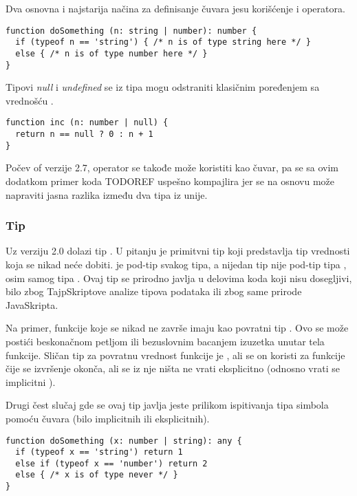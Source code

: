 Dva osnovna i najstarija načina za definisanje čuvara jesu korišćenje  i  operatora.

\begin{verbatim}
function doSomething (n: string | number): number {
  if (typeof n == 'string') { /* n is of type string here */ }
  else { /* n is of type number here */ }
}
\end{verbatim}

Tipovi \textit{null} i \textit{undefined} se iz tipa mogu odstraniti klasičnim poređenjem sa vrednošću .

\begin{verbatim}
function inc (n: number | null) {
  return n == null ? 0 : n + 1
}
\end{verbatim}

Počev of verzije 2.7, operator  se takođe može koristiti kao čuvar, pa se sa ovim dodatkom primer koda TODOREF uspešno kompajlira jer se na osnovu  može napraviti jasna razlika između dva tipa iz unije. 

\subsubsection{Tip }

Uz verziju 2.0 dolazi tip .
U pitanju je primitvni tip koji predstavlja tip vrednosti koja se nikad neće dobiti.
 je pod-tip svakog tipa, a nijedan tip nije pod-tip tipa , osim samog tipa .
Ovaj tip se prirodno javlja u delovima koda koji nisu dosegljivi, bilo zbog TajpSkriptove analize tipova podataka ili zbog same prirode JavaSkripta.

Na primer, funkcije koje se nikad ne završe imaju kao povratni tip .
Ovo se može postići beskonačnom petljom ili bezuslovnim bacanjem izuzetka unutar tela funkcije.
Sličan tip za povratnu vrednost funkcije je , ali se on koristi za funkcije čije se izvršenje okonča, ali se iz nje ništa ne vrati eksplicitno (odnosno vrati se implicitni ).

Drugi čest slučaj gde se ovaj tip javlja jeste prilikom ispitivanja tipa simbola pomoću čuvara (bilo implicitnih ili eksplicitnih).

\begin{verbatim}
function doSomething (x: number | string): any {
  if (typeof x == 'string') return 1
  else if (typeof x == 'number') return 2
  else { /* x is of type never */ }
}
\end{verbatim}

